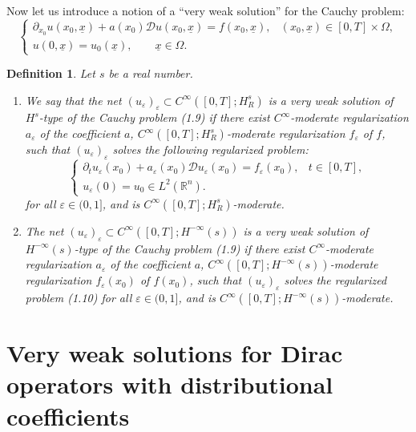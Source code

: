 \documentclass[12pt]{amsart}
\newtheorem{definition}[theorem]{Definition}
\theoremstyle{definition}
\newcommand{\un}{\underline}
\begin{document}
Now let us introduce a notion of a ``very weak solution'' for the Cauchy problem:
\[
\begin{cases}
\partial_{x_0} u(x_0,\un{x}) + a(x_0) \mathcal{D} u(x_0,\un{x})= f(x_0,\un{x}), & (x_0,\un{x}) \in [0, T]\times \Omega, \\
u(0,\un{x}) = u_0{(\un{x})}, \qquad \un{x}\in \Omega.
\end{cases}
\]

\vspace*{0.1cm}
\begin{definition}
\label{def-1.4-hip}
Let $s$ be a real number.
\begin{enumerate}
    \item[(i)] We say that the net $(u_\varepsilon)_\varepsilon \subset C^\infty([0, T]; H_R^s)$ is a very weak solution of $H^s$-type of the Cauchy problem (1.9) if there exist $C^\infty$-moderate regularization $a_\varepsilon$ of the coefficient $a$, $C^\infty([0, T]; H_R^s)$-moderate regularization $f_\varepsilon$ of $f$, such that $(u_\varepsilon)_\varepsilon$ solves the following regularized problem:
    \[
    \begin{cases}
    \partial_t u_\varepsilon(x_0) + a_\varepsilon(x_0) \mathcal{D} u_\varepsilon(x_0) = f_\varepsilon(x_0), & t \in [0, T], \\
    u_\varepsilon(0) = u_0 \in L^2(\mathbb{R}^n).
    \end{cases} 
    \]
    for all $\varepsilon \in (0, 1]$, and is $C^\infty([0, T]; H_R^s)$-moderate.
    
    \item[(ii)] The net $(u_\varepsilon)_\varepsilon \subset C^\infty([0, T]; H^{-\infty}(s))$ is a very weak solution of $H^{-\infty}(s)$-type of the Cauchy problem (1.9) if there exist $C^\infty$-moderate regularization $a_\varepsilon$ of the coefficient $a$, $C^\infty([0, T]; H^{-\infty}(s))$-moderate regularization $f_\varepsilon(x_0)$ of $f(x_0)$, such that $(u_\varepsilon)_\varepsilon$ solves the regularized problem (1.10) for all $\varepsilon \in (0, 1]$, and is $C^\infty([0, T]; H^{-\infty}(s))$-moderate.
\end{enumerate}
\end{definition}

\section{Very weak solutions for Dirac operators with distributional coefficients}
\end{document}
